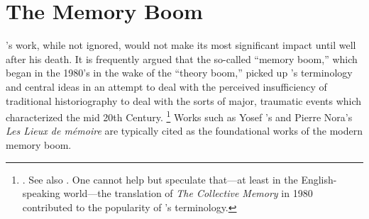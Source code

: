 
\section{The Memory Boom}

\halbwachs's work, while not ignored, would not make its most significant impact until well after his death. It is frequently argued that the so-called ``memory boom,'' which began in the 1980's in the wake of the ``theory boom,'' picked up \halbwachs's terminology and central ideas in an attempt to deal with the perceived insufficiency of traditional historiography to deal with the sorts of major, traumatic events which characterized the mid 20th Century.%
%
\footnote{\cite[1--2]{galinsky_galinsky2016}. See also \cite[29--36]{olick_olick-etal2011}. One cannot help but speculate that---at least in the English-speaking world---the translation of \emph{The Collective Memory} in 1980 contributed to the popularity of \halbwachs's terminology.}
%
Works such as Yosef \yerushalmi's  and Pierre Nora's \emph{Les Lieux de mémoire} are typically cited as the foundational works of the modern memory boom.\autocites[112--113]{klein2011}{yerushalmi1989}[Nora's massive project has been abridged and translated into English as][]{nora1996}  

